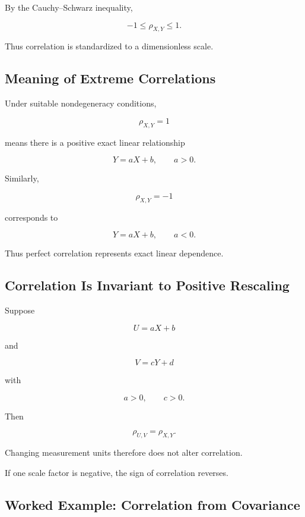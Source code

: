 By the Cauchy--Schwarz inequality,

\[
\boxed{
-1
\leq
\rho_{X,Y}
\leq
1.
}
\]

Thus correlation is standardized to a dimensionless scale.

\subsection{Meaning of Extreme Correlations}
\label{subsec:extreme-correlations}

Under suitable nondegeneracy conditions,

\[
\rho_{X,Y}=1
\]

means there is a positive exact linear relationship

\[
Y=aX+b,
\qquad
a>0.
\]

Similarly,

\[
\rho_{X,Y}=-1
\]

corresponds to

\[
Y=aX+b,
\qquad
a<0.
\]

Thus perfect correlation represents exact linear dependence.

\subsection{Correlation Is Invariant to Positive Rescaling}
\label{subsec:correlation-scale}

Suppose

\[
U=aX+b
\]

and

\[
V=cY+d
\]

with

\[
a>0,
\qquad
c>0.
\]

Then

\[
\boxed{
\rho_{U,V}
=
\rho_{X,Y}.
}
\]

Changing measurement units therefore does not alter correlation.

If one scale factor is negative, the sign of correlation reverses.

\subsection{Worked Example: Correlation from Covariance}
\label{subsec:worked-correlation}


